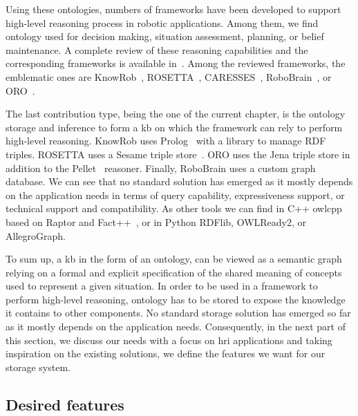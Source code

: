 Using these ontologies, numbers of frameworks have been developed to support high-level reasoning process in robotic applications. Among them, we find ontology used for decision making, situation assessment, planning, or belief maintenance. A complete review of these reasoning capabilities and the corresponding frameworks is available in~\cite{olivares_2019_review}. Among the reviewed frameworks, the emblematic ones are KnowRob~\cite{tenorth_2013_knowrob}, ROSETTA~\cite{stenmark_2013_knowledge}, CARESSES~\cite{bruno_2017_caresses}, RoboBrain~\cite{saxena_2014_robobrain}, or ORO~\cite{lemaignan_2010_oro}.

The last contribution type, being the one of the current chapter, is the ontology storage and inference to form a \acrlong{kb} on which the framework can rely to perform high-level reasoning. KnowRob uses Prolog~\cite{wielemaker_2003_prolog} with a library to manage RDF triples. ROSETTA uses a Sesame triple store~\cite{broekstra_2002_sesame}. ORO uses the Jena triple store in addition to the Pellet~\cite{sirin_2007_pellet} reasoner. Finally, RoboBrain uses a custom graph database. We can see that no standard solution has emerged as it mostly depends on the application needs in terms of query capability, expressiveness support, or technical support and compatibility. As other tools we can find in C++ owlcpp~\cite{levin_2011_owl} based on Raptor and Fact++~\cite{tsarkov_2006_fact}, or in Python RDFlib, OWLReady2, or AllegroGraph.

To sum up, a \acrlong{kb} in the form of an ontology, can be viewed as a semantic graph relying on a formal and explicit specification of the shared meaning of concepts used to represent a given situation. In order to be used in a framework to perform high-level reasoning, ontology has to be stored to expose the knowledge it contains to other components. No standard storage solution has emerged so far as it mostly depends on the application needs. Consequently, in the next part of this section, we discuss our needs with a focus on \acrlong{hri} applications and taking inspiration on the existing solutions, we define the features we want for our storage system.


\subsection{Desired features}


